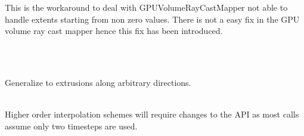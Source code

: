 \begin{DoxyRefList}
\label{todo__todo000005}%
%
This is the workaround to deal with GPUVolume\+Ray\+Cast\+Mapper not able to handle extents starting from non zero values. There is not a easy fix in the GPU volume ray cast mapper hence this fix has been introduced.  
\item[{\parbox[t]{\linewidth}{Class \doxylink{classvtk_modified_b_s_p_tree}{vtk\+Modified\+BSPTree} }}]\hfill \\
\label{todo__todo000011}%
%
 
\item[{\parbox[t]{\linewidth}{Class \doxylink{classvtk_poly_plane}{vtk\+Poly\+Plane} }}]\hfill \\
\label{todo__todo000012}%
%
 Generalize to extrusions along arbitrary directions.  
\item[{\parbox[t]{\linewidth}{Class \doxylink{classvtk_temporal_interpolator}{vtk\+Temporal\+Interpolator} }}]\hfill \\
\label{todo__todo000013}%
%
 Higher order interpolation schemes will require changes to the API as most calls assume only two timesteps are used.
\end{DoxyRefList}